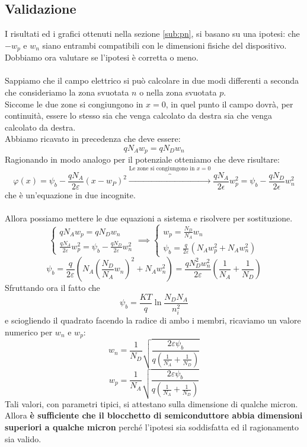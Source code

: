\documentclass{article}
\numberwithin{equation}{subsection}
\begin{document}
	\subsection{Validazione}
	I risultati ed i grafici ottenuti nella sezione \ref{sub:pn}, si basano su una ipotesi: che $-w_p$ e $w_n$ siano entrambi compatibili con le dimensioni fisiche del dispositivo. \\
	Dobbiamo ora valutare se l’ipotesi è corretta o meno.\\\\
	Sappiamo che il campo elettrico si può calcolare in due modi differenti a seconda che consideriamo la zona svuotata $n$ o nella zona svuotata $p$. \\
	Siccome le due zone si congiungono in $x = 0$, in quel punto il campo dovrà, per continuità, essere lo stesso sia che venga calcolato da destra sia che venga calcolato da destra. \\
	Abbiamo ricavato in precedenza che deve essere:
	$$qN_A w_p = qN_D w_n$$
	Ragionando in modo analogo per il potenziale otteniamo che deve risultare:
	$$\varphi(x)=\psi_{b}-\frac{qN_{A}}{2\varepsilon}\left(x-w_{P}\right)^{2} \overbrace{\rightarrow}^{\text{Le zone si congiungono in }x=0} \frac{qN_A}{2\epsilon} w_p^2 = \psi_b - \frac{qN_D}{2\epsilon} w_n^2$$
	che è un’equazione in due incognite.\\\\
	Allora possiamo mettere le due equazioni a sistema e risolvere per sostituzione.
	$$\begin{cases} 
		qN_A w_p = qN_D w_n \\ 
		\frac{qN_A}{2\varepsilon} w_p^2 = \psi_b - \frac{qN_D}{2\varepsilon} w_n^2 
	\end{cases} 
	\implies 
	\begin{cases} 
		w_p = \frac{N_D}{N_A} w_n \\ 
		\psi_b = \frac{q}{2\varepsilon} \left( N_A w_p^2 + N_A w_n^2 \right) 
	\end{cases}$$
	$$\psi_b = \frac{q}{2\varepsilon} \left( N_A \left( \frac{N_D}{N_A} w_n \right)^2 + N_A w_n^2 \right) = \frac{qN_D^2 w_n^2}{2\varepsilon} \left( \frac{1}{N_A} + \frac{1}{N_D} \right)$$
	Sfruttando ora il fatto che
	$$\psi_b = \frac{KT}{q} \ln \frac{N_D N_A}{n_i^2}$$
	e sciogliendo il quadrato facendo la radice di ambo i membri, ricaviamo un valore numerico per $w_n$ e $w_p$:
	$$w_n = \frac{1}{N_D} \sqrt{\frac{2\varepsilon \psi_b}{q \left( \frac{1}{N_A} + \frac{1}{N_D} \right)}}$$
	$$w_p = \frac{1}{N_A} \sqrt{\frac{2\varepsilon \psi_b}{q \left( \frac{1}{N_A} + \frac{1}{N_D} \right)}}$$
	Tali valori, con parametri tipici, si attestano sulla dimensione di qualche micron. \\
	Allora \textbf{è sufficiente che il blocchetto di semiconduttore abbia dimensioni superiori a qualche micron} perché l’ipotesi sia soddisfatta ed il ragionamento sia valido.
\end{document}
